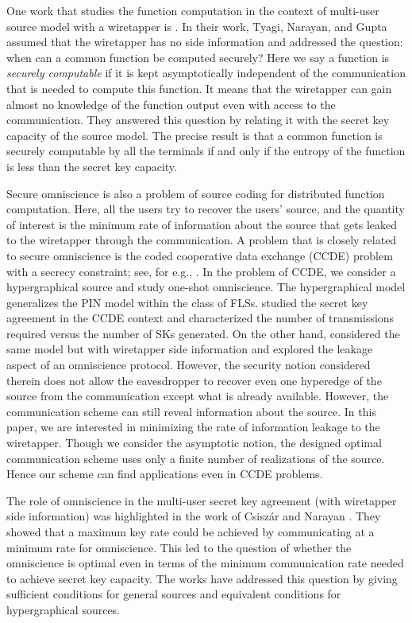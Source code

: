 One work that studies the function computation in the context of  multi-user source model with a wiretapper is \cite{tyagi11}. In their work, Tyagi, Narayan, and Gupta assumed that the wiretapper has no side information and addressed the question: when can a common function be computed securely? Here we say a function is \emph{securely computable} if it is kept asymptotically independent of the communication that is needed to compute this function. It means that the wiretapper can gain almost no knowledge of the function output even with access to the communication. They answered this question by 
relating it with the secret key capacity of the source model. The precise result is that a common function is securely computable by all the terminals if and only if  the entropy of the function is less than the secret key capacity. 

Secure omniscience is also a problem of source coding for distributed function computation. Here, all the users try to recover the users' source, and the quantity of interest is the minimum rate of information about the source that gets leaked to the wiretapper through the communication. A problem that is closely related to secure omniscience is the coded cooperative data exchange (CCDE) problem with a secrecy constraint; see, for e.g., \cite{sprinston13, courtade16}. In the problem of CCDE, we consider a hypergraphical source and study one-shot omniscience. The hypergraphical model generalizes the PIN model within the class of FLSs. \cite{courtade16} studied the secret key agreement in the CCDE context and characterized the number of transmissions required versus the number of SKs generated. On the other hand, \cite{sprinston13} considered the same model but with wiretapper side information and explored the leakage aspect of an omniscience protocol. However, the security notion considered therein does not allow the eavesdropper to recover even one hyperedge of the source from the communication except what is already available. However, the communication scheme can still reveal information about the source. In this paper, we are interested in minimizing the rate of information leakage to the wiretapper. Though we consider the asymptotic notion, the  designed optimal communication scheme uses only a finite number of realizations of the source. Hence our scheme can find applications even in CCDE problems. 

The role of omniscience in the multi-user secret key agreement (with wiretapper side information) was highlighted in the work of Csisz{\'a}r and Narayan \cite{csiszar04}. They showed that a maximum key rate could be achieved  by communicating at a minimum rate for omniscience. This led to the question of whether the omniscience is optimal even in terms of the minimum communication rate needed to achieve secret key capacity. The works \cite{chan18, mukherjee16} have addressed this question by giving sufficient conditions for general sources and equivalent conditions for hypergraphical sources. 

